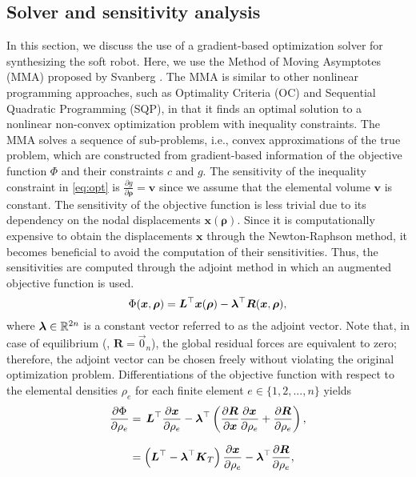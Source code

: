 \subsection{Solver and sensitivity analysis}
In this section, we discuss the use of a gradient-based optimization solver for synthesizing the soft robot. Here, we use the Method of Moving Asymptotes (MMA) proposed by Svanberg \cite{Svanberg1987Feb}. The MMA is similar to other nonlinear programming approaches, such as Optimality Criteria (OC) and Sequential Quadratic Programming (SQP), in that it finds an optimal solution to a nonlinear non-convex optimization problem with inequality constraints. The MMA solves a sequence of sub-problems, i.e., convex approximations of the true problem, which are constructed from gradient-based information of the objective function $\Phi$ and their constraints $c$ and $g$. The sensitivity of the inequality constraint in \eqref{eq:opt} is $\frac{\partial g}{\partial \boldsymbol{\rho}} = \boldsymbol{v}$ since we assume that the elemental volume $\boldsymbol{v}$ is constant. The sensitivity of the objective function is less trivial due to its dependency on the nodal displacements $\boldsymbol{x}(\boldsymbol{\rho})$. Since it is computationally expensive to obtain the displacements $\boldsymbol{x}$ through the Newton-Raphson method, it becomes beneficial to avoid the computation of their sensitivities. Thus, the sensitivities are computed through the adjoint method in which an augmented objective function is used.
%
\begin{equation}
{\Phi}({\boldsymbol{x}},\boldsymbol{\rho}) = \boldsymbol{L}^\top \boldsymbol{x}(\boldsymbol{\rho}) - \boldsymbol{\lambda}^\top \boldsymbol{R}({\boldsymbol{x}},\boldsymbol{\rho}),
\end{equation}
%
where $\boldsymbol{\lambda} \in \mathbb{R}^{2n}$ is a constant vector referred to as the adjoint vector. Note that, in case of equilibrium (\ie, $\boldsymbol{R} = \vec{0}_n$), the global residual forces are equivalent to zero; therefore, the adjoint vector can be chosen freely without violating the original optimization problem. 
Differentiations of the objective function with respect to the elemental densities $\rho_e$ for each finite element $e \in \{1,2,...,n\}$ yields
%
\begin{align}
\frac{\partial \Phi}{\partial {\rho_e}} & = \,\boldsymbol{L}^\top \frac{\partial {\boldsymbol{x}}}{\partial \rho_e} - \boldsymbol{\lambda}^\top\left(\frac{\partial \boldsymbol{R}}{ \partial {\boldsymbol{x}}} \frac{\partial {\boldsymbol{x}}}{\partial \rho_e} + \frac{\partial \boldsymbol{R}}{ \partial \rho_e} \right), \notag \\[0.75em]
 & = \left(\boldsymbol{L}^\top - \boldsymbol{\lambda}^\top \boldsymbol{K}_T \right) \frac{\partial \boldsymbol{x}}{\partial \rho_e} - \boldsymbol{\lambda}^\top \frac{\partial \boldsymbol{R}}{\partial \rho_e},  \label{eq:sen_deriv} 
\end{align}
